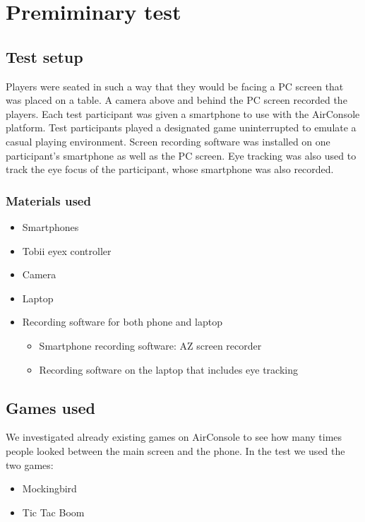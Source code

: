 \chapter{Premiminary test}\label{ch:PreTest}
\section{Test setup}
Players were seated in such a way that they would be facing a PC screen that was placed on a table. A camera above and behind the PC screen recorded the players. Each test participant was given a smartphone to use with the AirConsole platform. Test participants played a designated game uninterrupted to emulate a casual playing environment. Screen recording software was installed on one participant’s smartphone as well as the PC screen. Eye tracking was also used to track the eye focus of the participant, whose smartphone was also recorded.


\subsection{Materials used}
\begin{itemize}
\item Smartphones
\item Tobii eyex controller
\item Camera
\item Laptop
\item Recording software for both phone and laptop
\begin{itemize}
	\item Smartphone recording software: AZ screen recorder
	\item Recording software on the laptop that includes eye tracking
\end{itemize}
\end{itemize}

	
\section{Games used}
We investigated already existing games on AirConsole to see how many times people looked between the main screen and the phone. In the test we used the two games:
\begin{itemize}
\item Mockingbird
\item Tic Tac Boom
\end{itemize}

